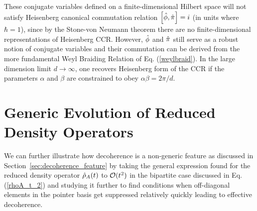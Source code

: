 \documentclass[aps,pra,onecolumn,nofootinbib,notitlepage,11pt,tightenlines]{revtex4-1}
\begin{document}
These conjugate variables defined on a finite-dimensional Hilbert space will not satisfy Heisenberg canonical commutation relation $ \left[ \hat{\phi},\hat{\pi} \right] = i $ (in units where $\hbar = 1$), since by the Stone-von Neumann theorem there are no finite-dimensional representations of Heisenberg CCR. However, $\hat{\phi}$ and $\hat{\pi}$ still serve as a robust notion of conjugate variables and their commutation can be derived from the more fundamental Weyl Braiding Relation of Eq. (\ref{weylbraid}). In the large dimension limit $d \to \infty$, one recovers Heisenberg form of the CCR if the parameters $\alpha$ and $\beta$ are constrained to obey $\alpha \beta = 2\pi/d$. 


\section{Generic Evolution of Reduced Density Operators}
\label{app:non-generic}

We can further illustrate how decoherence is a non-generic feature as discussed in Section~\ref{sec:decoherence_feature} by taking the general expression found for the reduced density operator $\hat{\rho}_{A}(t)$ to $\mathcal{O}(t^2)$ in the bipartite case discussed in Eq. (\ref{rhoA_t_2}) and studying it further to find conditions when off-diagonal elements in the pointer basis get suppressed relatively quickly leading to effective decoherence. 
\end{document}
